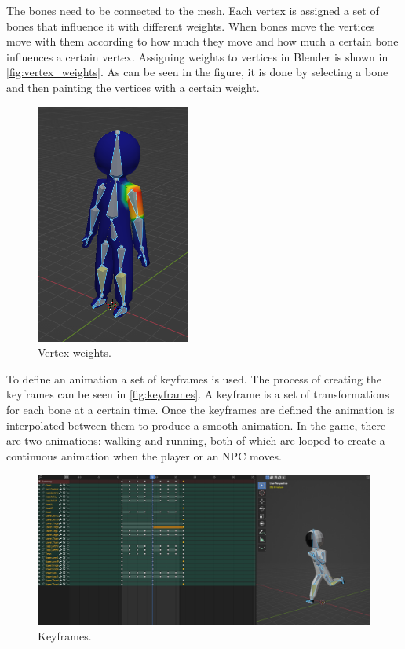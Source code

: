 The bones need to be connected to the mesh.
Each vertex is assigned a set of bones that influence it with different weights.
When bones move the vertices move with them according to how much they move and how much a certain bone influences a certain vertex.
Assigning weights to vertices in Blender is shown in \autoref{fig:vertex_weights}.
As can be seen in the figure, it is done by selecting a bone and then painting the vertices with a certain weight.

\begin{figure}[h]
    \centering
    \includegraphics[width=0.45\textwidth]{chapters/theoretical_foundations/sections/models/resources/WeightPaint.png}
    \caption{Vertex weights.}
    \label{fig:vertex_weights}
\end{figure}

To define an animation a set of keyframes is used.
The process of creating the keyframes can be seen in \autoref{fig:keyframes}.
A keyframe is a set of transformations for each bone at a certain time.
Once the keyframes are defined the animation is interpolated between them to produce a smooth animation.
In the game, there are two animations: walking and running, both of which are looped to create a continuous animation when the player or an NPC moves.

\begin{figure}[h]
    \centering
    \includegraphics[width=1\textwidth]{chapters/theoretical_foundations/sections/models/resources/DopeSheet.png}
    \caption{Keyframes.}
    \label{fig:keyframes}
\end{figure}


